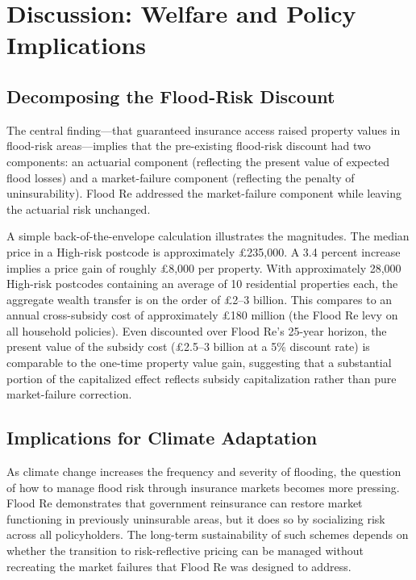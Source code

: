 \documentclass[12pt]{article}
\begin{document}
\section{Discussion: Welfare and Policy Implications} \label{sec:welfare}

\subsection{Decomposing the Flood-Risk Discount}

The central finding---that guaranteed insurance access raised property values in flood-risk areas---implies that the pre-existing flood-risk discount had two components: an actuarial component (reflecting the present value of expected flood losses) and a market-failure component (reflecting the penalty of uninsurability). Flood Re addressed the market-failure component while leaving the actuarial risk unchanged.

A simple back-of-the-envelope calculation illustrates the magnitudes. The median price in a High-risk postcode is approximately \pounds235,000. A 3.4 percent increase implies a price gain of roughly \pounds8,000 per property. With approximately 28,000 High-risk postcodes containing an average of 10 residential properties each, the aggregate wealth transfer is on the order of \pounds2--3 billion. This compares to an annual cross-subsidy cost of approximately \pounds180 million (the Flood Re levy on all household policies). Even discounted over Flood Re's 25-year horizon, the present value of the subsidy cost (\pounds2.5--3 billion at a 5\% discount rate) is comparable to the one-time property value gain, suggesting that a substantial portion of the capitalized effect reflects subsidy capitalization rather than pure market-failure correction.

\subsection{Implications for Climate Adaptation}

As climate change increases the frequency and severity of flooding, the question of how to manage flood risk through insurance markets becomes more pressing. Flood Re demonstrates that government reinsurance can restore market functioning in previously uninsurable areas, but it does so by socializing risk across all policyholders. The long-term sustainability of such schemes depends on whether the transition to risk-reflective pricing can be managed without recreating the market failures that Flood Re was designed to address.
\end{document}
